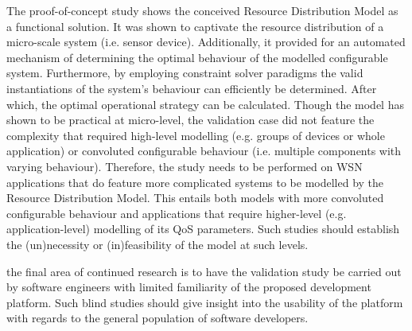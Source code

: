 The proof-of-concept study shows the conceived Resource Distribution Model as a functional solution. It was shown to captivate the resource distribution of a micro-scale system (i.e. sensor device). Additionally, it provided for an automated mechanism of determining the optimal behaviour of the modelled configurable system. Furthermore, by employing constraint solver paradigms the valid instantiations of the system's behaviour can efficiently be determined. After which, the optimal operational strategy can be calculated. Though the model has shown to be practical at micro-level, the validation case did not feature the complexity that required high-level modelling (e.g. groups of devices or whole application) or convoluted configurable behaviour (i.e. multiple components with varying behaviour). Therefore, the study needs to be performed on WSN applications that do feature more complicated systems to be modelled by the Resource Distribution Model. This entails both models with more convoluted configurable behaviour and applications that require higher-level (e.g. application-level) modelling of its QoS parameters. Such studies should establish the (un)necessity or (in)feasibility of the model at such levels.

the final area of continued research is to have the validation study be carried out by software engineers with limited familiarity of the proposed development platform. Such blind studies should give insight into the usability of the platform with regards to the general population of software developers. 
	

	
	


	

